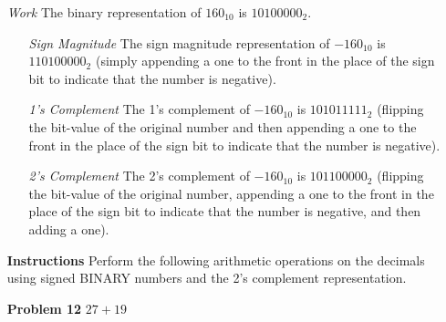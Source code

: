 \documentclass[12pt]{article}
\begin{document}
\begin{enumerate}
  \item[\textit{Work}] The binary representation of $160_{10}$ is $10100000_2$.
  \begin{enumerate}
    \item[\textit{Sign Magnitude}] The sign magnitude representation of $-160_{10}$ is $110100000_2$ (simply appending a one to the front in the place of the sign bit to indicate that the number is negative).
    \item[\textit{1's Complement}] The 1's complement of $-160_{10}$ is $101011111_2$ (flipping the bit-value of the original number and then appending a one to the front in the place of the sign bit to indicate that the number is negative).
    \item[\textit{2's Complement}] The 2's complement of $-160_{10}$ is $101100000_2$ (flipping the bit-value of the original number, appending a one to the front in the place of the sign bit to indicate that the number is negative, and then adding a one).
  \end{enumerate}
\end{enumerate}

\begin{enumerate}
  \item[\textbf{Instructions}] Perform the following arithmetic operations on the decimals using signed BINARY numbers and the 2’s complement representation.
\end{enumerate}

\begin{enumerate}
  \item[\textbf{Problem 12}] $27+19$
\end{enumerate}
\end{document}
